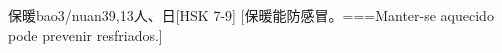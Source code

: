 \begin{EntryWithPhonetic}{保暖}{bao3/nuan3}{9,13}{⼈、⽇}[HSK 7-9]
  [保暖能防感冒。===Manter-se aquecido pode prevenir resfriados.]
\end{EntryWithPhonetic}
